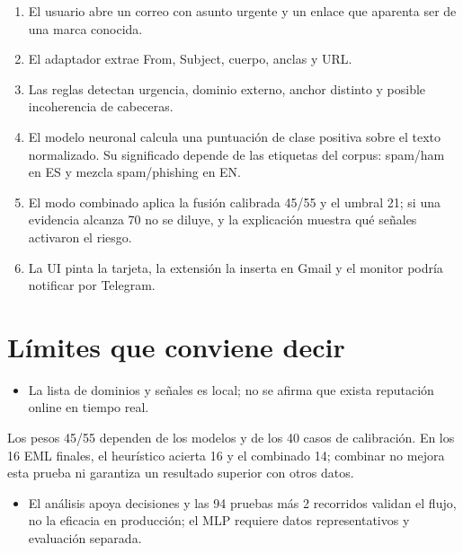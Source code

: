 \documentclass[11pt,a4paper]{article}
\begin{document}
\begin{enumerate}
  \item El usuario abre un correo con asunto urgente y un enlace que aparenta ser de una marca conocida.
  \item El adaptador extrae From, Subject, cuerpo, anclas y URL.
  \item Las reglas detectan urgencia, dominio externo, anchor distinto y posible incoherencia de cabeceras.
  \item El modelo neuronal calcula una puntuación de clase positiva sobre el texto normalizado. Su significado depende de las etiquetas del corpus: spam/\allowbreak{}ham en ES y mezcla spam/\allowbreak{}phishing en EN.
  \item El modo combinado aplica la fusión calibrada 45/\allowbreak{}55 y el umbral 21; si una evidencia alcanza 70 no se diluye, y la explicación muestra qué señales activaron el riesgo.
  \item La UI pinta la tarjeta, la extensión la inserta en Gmail y el monitor podría notificar por Telegram.
\end{enumerate}

\section{Límites que conviene decir}

\begin{itemize}
  \item La lista de dominios y señales es local; no se afirma que exista reputación online en tiempo real.
\end{itemize}

Los pesos 45/\allowbreak{}55 dependen de los modelos y de los 40 casos de calibración. En los 16 EML finales, el heurístico acierta 16 y el combinado 14; combinar no mejora esta prueba ni garantiza un resultado superior con otros datos.

\begin{itemize}
  \item El análisis apoya decisiones y las 94 pruebas más 2 recorridos validan el flujo, no la eficacia en producción; el MLP requiere datos representativos y evaluación separada.
\end{itemize}
\end{document}
